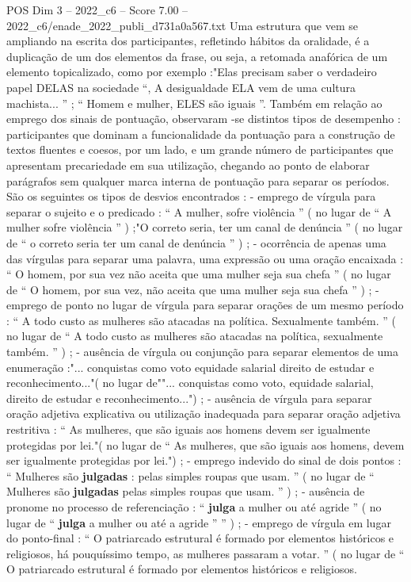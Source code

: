 \begin{textsample}{POS Dim 3 – 2022\_c6 – Score 7.00 – 2022\_c6/enade\_2022\_publi\_d731a0a567.txt}
Uma estrutura que vem se ampliando na escrita dos participantes, refletindo hábitos da oralidade, é a duplicação de um dos elementos da frase, ou seja, a retomada anafórica de um elemento topicalizado, como por exemplo :"Elas precisam saber o verdadeiro papel DELAS na sociedade “, A desigualdade ELA vem de uma cultura machista... ” ; “ Homem e mulher, ELES são iguais ”.
Também em relação ao emprego dos sinais de pontuação, observaram -se distintos tipos de desempenho : participantes que dominam a funcionalidade da pontuação para a construção de textos fluentes e coesos, por um lado, e um grande número de participantes que apresentam precariedade em sua utilização, chegando ao ponto de elaborar parágrafos sem qualquer marca interna de pontuação para separar os períodos.
São os seguintes os tipos de desvios encontrados : - emprego de vírgula para separar o sujeito e o predicado : “ A mulher, sofre violência ” ( no lugar de “ A mulher sofre violência ” ) ;"O correto seria, ter um canal de denúncia ” ( no lugar de “ o correto seria ter um canal de denúncia ” ) ; - ocorrência de apenas uma das vírgulas para separar uma palavra, uma expressão ou uma oração encaixada : “ O homem, por sua vez não aceita que uma mulher seja sua chefa ” ( no lugar de “ O homem, por sua vez, não aceita que uma mulher seja sua chefa ” ) ; - emprego de ponto no lugar de vírgula para separar orações de um mesmo período : “ A todo custo as mulheres são atacadas na política.
Sexualmente também. ” ( no lugar de “ A todo custo as mulheres são atacadas na política, sexualmente também. ” ) ; - ausência de vírgula ou conjunção para separar elementos de uma enumeração :"... conquistas como voto equidade salarial direito de estudar e reconhecimento..."( no lugar de""... conquistas como voto, equidade salarial, direito de estudar e reconhecimento...") ; - ausência de vírgula para separar oração adjetiva explicativa ou utilização inadequada para separar oração adjetiva restritiva : “ As mulheres, que são iguais aos homens devem ser igualmente protegidas por lei."( no lugar de “ As mulheres, que são iguais aos homens, devem ser igualmente protegidas por lei.") ; - emprego indevido do sinal de dois pontos : “ Mulheres são \textbf{julgadas} : pelas simples roupas que usam. ” ( no lugar de “ Mulheres são \textbf{julgadas} pelas simples roupas que usam. ” ) ; - ausência de pronome no processo de referenciação : “ \textbf{julga} a mulher ou até agride ” ( no lugar de “ \textbf{julga} a mulher ou até a agride ” ” ) ; - emprego de vírgula em lugar do ponto-final : “ O patriarcado estrutural é formado por elementos históricos e religiosos, há pouquíssimo tempo, as mulheres passaram a votar. ” ( no lugar de “ O patriarcado estrutural é formado por elementos históricos e religiosos.

\end{textsample}
